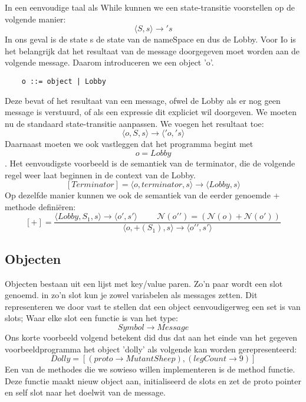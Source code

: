 \documentclass[12pt]{article}
\begin{document}
In een eenvoudige taal als While kunnen we een state-transitie voorstellen op de volgende manier:
\[\langle S,s \rangle \rightarrow \prime s\]
In ons geval is de state s de state van de nameSpace en dus de Lobby.
Voor Io is het belangrijk dat het resultaat van de message doorgegeven moet worden aan de volgende message. Daarom introduceren we een object 'o'.
\begin{lstlisting}
	o ::= object | Lobby
\end{lstlisting}
Deze bevat of het resultaat van een message, ofwel de Lobby als er nog geen message is verstuurd, of als een expressie dit expliciet wil doorgeven. We moeten nu de standaard state-transitie aanpassen. We voegen het resultaat toe:
\[\langle o,S,s \rangle \rightarrow \langle \prime o,\prime s \rangle\]
Daarnaast moeten we ook vastleggen dat het programma begint met \[o = Lobby\].
Het eenvoudigste voorbeeld is de semantiek van de terminator, die de volgende regel weer laat beginnen in de context van de Lobby.
\[[Terminator] = \langle o, terminator, s\rangle \rightarrow \langle Lobby, s\rangle\]
Op dezelfde manier kunnen we ook de semantiek van de eerder genoemde + methode definiëren:
\[[+] = 
\frac{
	\langle Lobby, S_1, s \rangle \rightarrow \langle o\prime, s\prime \rangle \hspace{1cm}
	\mathcal{N}(o\prime\prime) = (\mathcal{N}(o) + \mathcal{N}(o\prime))
	}{ \langle o, +(S_1), s \rangle \rightarrow \langle o\prime\prime,s\prime \rangle}
 \]

\subsection{Objecten}
Objecten bestaan uit een lijst met key/value paren. Zo'n paar wordt een slot genoemd.
in zo'n slot kun je zowel variabelen als messages zetten.
Dit representeren we door vast te stellen dat een object eenvoudigerweg een set is van slots; Waar elke slot een functie is van het type:
\[ Symbol \rightarrow Message \]
Ons korte voorbeeld volgend betekent did dus dat aan het einde van het gegeven voorbeeldprogramma het object 'dolly' als volgende kan worden gerepresenteerd:
\[
Dolly = [
	(proto \rightarrow MutantSheep),
	(legCount \rightarrow 9)]
\]
Een van de methodes die we sowieso willen implementeren is de method functie. 
Deze functie maakt nieuw object aan, initialiseerd de slots en zet de proto pointer en self slot naar het doelwit van de message. 
\end{document}
